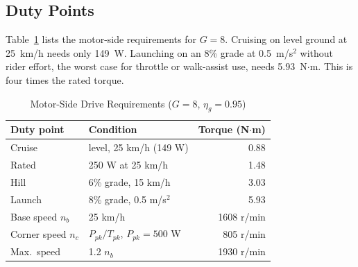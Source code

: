 \documentclass[journal]{IEEEtran}
\begin{document}
\subsection{Duty Points}
Table~\ref{tab:duty} lists the motor-side requirements for $G=8$. Cruising on
level ground at 25~km/h needs only 149~W. Launching on an 8\% grade at
0.5~m/s$^2$ without rider effort, the worst case for throttle or walk-assist
use, needs 5.93~N$\cdot$m. This is four times the rated torque.

\begin{table}[!t]
\caption{Motor-Side Drive Requirements ($G = 8$, $\eta_g=0.95$)}
\label{tab:duty}
\centering
\renewcommand{\arraystretch}{1.1}
\begin{tabular}{l l r}
\hline
Duty point & Condition & Torque (N$\cdot$m)\\
\hline
Cruise & level, 25 km/h (149 W) & 0.88\\
Rated & 250 W at 25 km/h & 1.48\\
Hill & 6\% grade, 15 km/h & 3.03\\
Launch & 8\% grade, 0.5 m/s$^2$ & 5.93\\
\hline
Base speed $n_b$ & 25 km/h & 1608 r/min\\
Corner speed $n_c$ & $P_{pk}/T_{pk}$, $P_{pk}=500$ W & 805 r/min\\
Max.\ speed & 1.2 $n_b$ & 1930 r/min\\
\hline
\end{tabular}
\end{table}
\end{document}
